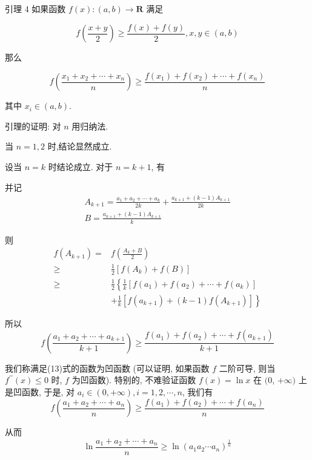 引理 4 如果函数 $f(x):(a, b) \rightarrow \mathbf{R}$ 满足

\begin{equation*}
f\left(\frac{x+y}{2}\right) \geqslant \frac{f(x)+f(y)}{2}, x, y \in(a, b) \tag{13}
\end{equation*}

那么

\begin{equation*}
f\left(\frac{x_{1}+x_{2}+\cdots+x_{n}}{n}\right) \geqslant \frac{f\left(x_{1}\right)+f\left(x_{2}\right)+\cdots+f\left(x_{n}\right)}{n} \tag{14}
\end{equation*}

其中 $x_{i} \in(a, b)$.

引理的证明: 对 $n$ 用归纳法.

当 $n=1,2$ 时,结论显然成立.

设当 $n=k$ 时结论成立. 对于 $n=k+1$, 有

并记
$$
\begin{gathered}
A_{k+1}=\frac{a_{1}+a_{2}+\cdots+a_{k}}{2 k}+\frac{a_{k+1}+(k-1) A_{k+1}}{2 k} \\
B=\frac{a_{k+1}+(k-1) A_{k+1}}{k}
\end{gathered}
$$

则
$$
\begin{aligned}
f\left(A_{k+1}\right)= & f\left(\frac{A_{k}+B}{2}\right) \\
\geqslant & \frac{1}{2}\left[f\left(A_{k}\right)+f(B)\right] \\
\geqslant & \frac{1}{2}\left\{\frac{1}{k}\left[f\left(a_{1}\right)+f\left(a_{2}\right)+\cdots+f\left(a_{k}\right)\right]\right. \\
& \left.+\frac{1}{k}\left[f\left(a_{k+1}\right)+(k-1) f\left(A_{k+1}\right)\right]\right\}
\end{aligned}
$$

所以
$$
f\left(\frac{a_{1}+a_{2}+\cdots+a_{k+1}}{k+1}\right) \geqslant \frac{f\left(a_{1}\right)+f\left(a_{2}\right)+\cdots+f\left(a_{k+1}\right)}{k+1}
$$

我们称满足(13)式的函数为凹函数 (可以证明, 如果函数 $f$ 二阶可导, 则当 $f^{\prime \prime}(x) \leqslant 0$ 时, $f$ 为凹函数). 特别的, 不难验证函数 $f(x)=\ln x$ 在 $(0$, $+\infty)$ 上是凹函数, 于是, 对 $a_{i} \in(0,+\infty), i=1,2, \cdots, n$, 我们有
$$
f\left(\frac{a_{1}+a_{2}+\cdots+a_{n}}{n}\right) \geqslant \frac{f\left(a_{1}\right)+f\left(a_{2}\right)+\cdots+f\left(a_{n}\right)}{n}
$$

从而
$$
\ln \frac{a_{1}+a_{2}+\cdots+a_{n}}{n} \geqslant \ln \left(a_{1} a_{2} \cdots a_{n}\right)^{\frac{1}{n}}
$$

